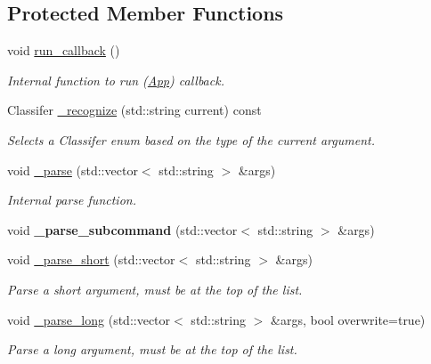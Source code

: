 \subsection*{Protected Member Functions}
\begin{DoxyCompactItemize}
\item 
\mbox{\label{class_c_l_i_1_1_app_a7669340db7d8cbb2eed9ceeb884dd61a}} 
void \hyperlink{class_c_l_i_1_1_app_a7669340db7d8cbb2eed9ceeb884dd61a}{run\+\_\+callback} ()
\begin{DoxyCompactList}\small\item\em Internal function to run (\hyperlink{class_c_l_i_1_1_app}{App}) callback. \end{DoxyCompactList}\item 
\mbox{\label{class_c_l_i_1_1_app_ae9fd9e6541f6c31e618538e81e2c7cde}} 
Classifer \hyperlink{class_c_l_i_1_1_app_ae9fd9e6541f6c31e618538e81e2c7cde}{\+\_\+recognize} (std\+::string current) const
\begin{DoxyCompactList}\small\item\em Selects a Classifer enum based on the type of the current argument. \end{DoxyCompactList}\item 
\mbox{\label{class_c_l_i_1_1_app_a241ba75a6c98b36349ae2f71a9137291}} 
void \hyperlink{class_c_l_i_1_1_app_a241ba75a6c98b36349ae2f71a9137291}{\+\_\+parse} (std\+::vector$<$ std\+::string $>$ \&args)
\begin{DoxyCompactList}\small\item\em Internal parse function. \end{DoxyCompactList}\item 
\mbox{\label{class_c_l_i_1_1_app_a426161917aba1daec0fdc5f3b6950e02}} 
void {\bfseries \+\_\+parse\+\_\+subcommand} (std\+::vector$<$ std\+::string $>$ \&args)
\item 
\mbox{\label{class_c_l_i_1_1_app_ad20d7e3b5292f92e41262e2bd2ff440d}} 
void \hyperlink{class_c_l_i_1_1_app_ad20d7e3b5292f92e41262e2bd2ff440d}{\+\_\+parse\+\_\+short} (std\+::vector$<$ std\+::string $>$ \&args)
\begin{DoxyCompactList}\small\item\em Parse a short argument, must be at the top of the list. \end{DoxyCompactList}\item 
\mbox{\label{class_c_l_i_1_1_app_aa301544c8196914c21020a4bd2eef6e6}} 
void \hyperlink{class_c_l_i_1_1_app_aa301544c8196914c21020a4bd2eef6e6}{\+\_\+parse\+\_\+long} (std\+::vector$<$ std\+::string $>$ \&args, bool overwrite=true)
\begin{DoxyCompactList}\small\item\em Parse a long argument, must be at the top of the list. \end{DoxyCompactList}\end{DoxyCompactItemize}
